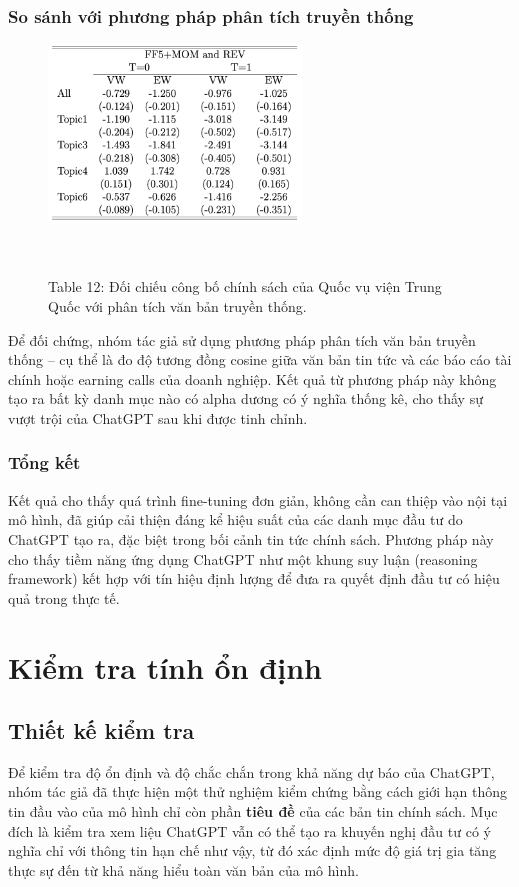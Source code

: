 \documentclass[a4paper,12pt]{article}
\begin{document}
\subsubsection{So sánh với phương pháp phân tích truyền thống}
\begin{figure}[H]
    \centering
    \includegraphics[width=0.6\textwidth]{table/tab12.png}
    \caption*{Table 12: Đối chiếu công bố chính sách của Quốc vụ viện Trung Quốc với phân tích văn bản truyền thống.}
    \
\end{figure}
Để đối chứng, nhóm tác giả sử dụng phương pháp phân tích văn bản truyền thống – cụ thể là đo độ tương đồng cosine giữa văn bản tin tức và các báo cáo tài chính hoặc earning calls của doanh nghiệp. Kết quả từ phương pháp này không tạo ra bất kỳ danh mục nào có alpha dương có ý nghĩa thống kê, cho thấy sự vượt trội của ChatGPT sau khi được tinh chỉnh.

\subsubsection{Tổng kết}
Kết quả cho thấy quá trình fine-tuning đơn giản, không cần can thiệp vào nội tại mô hình, đã giúp cải thiện đáng kể hiệu suất của các danh mục đầu tư do ChatGPT tạo ra, đặc biệt trong bối cảnh tin tức chính sách. Phương pháp này cho thấy tiềm năng ứng dụng ChatGPT như một khung suy luận (reasoning framework) kết hợp với tín hiệu định lượng để đưa ra quyết định đầu tư có hiệu quả trong thực tế.

\section{Kiểm tra tính ổn định}

\subsection{Thiết kế kiểm tra}

Để kiểm tra độ ổn định và độ chắc chắn trong khả năng dự báo của ChatGPT, nhóm tác giả đã thực hiện một thử nghiệm kiểm chứng bằng cách giới hạn thông tin đầu vào của mô hình chỉ còn phần \textbf{tiêu đề} của các bản tin chính sách. Mục đích là kiểm tra xem liệu ChatGPT vẫn có thể tạo ra khuyến nghị đầu tư có ý nghĩa chỉ với thông tin hạn chế như vậy, từ đó xác định mức độ giá trị gia tăng thực sự đến từ khả năng hiểu toàn văn bản của mô hình.
\end{document}
